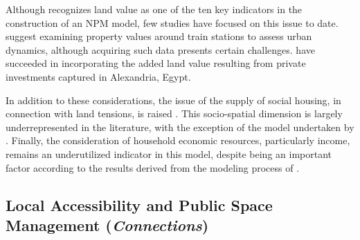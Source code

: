 \begin{refsegment}
Although \textcolor{blue}{\textcite{transportation_research_board_of_the_national_academies_transit_2007}} recognizes land value as one of the ten key indicators in the construction of an \acrshort{NPM} model, few studies have focused on this issue to date. \textcolor{blue}{\textcite[135]{kim_geographic_2018}} suggest examining property values around train stations to assess urban dynamics, although acquiring such data presents certain challenges. \textcolor{blue}{\textcite[242]{ibrahim_measuring_2023}} have succeeded in incorporating the added land value resulting from private investments captured in Alexandria, Egypt.

In addition to these considerations, the issue of the supply of social housing, in connection with land tensions, is raised \textcolor{blue}{\autocite[27]{singh_measuring_2015}}. This socio-spatial dimension is largely underrepresented in the literature, with the exception of the model undertaken by \textcolor{blue}{\textcite[2]{zhou_introducing_2023}}. Finally, the consideration of household economic resources, particularly income, remains an underutilized indicator in this model, despite being an important factor according to the results derived from the modeling process of \textcolor{blue}{\textcite[3]{cummings_does_2022}}.

\subsection{Local Accessibility and Public Space Management (\textsl{Connections})
    \label{chap6:methodologie-indicateurs-accessibility}
    }


\end{refsegment}
